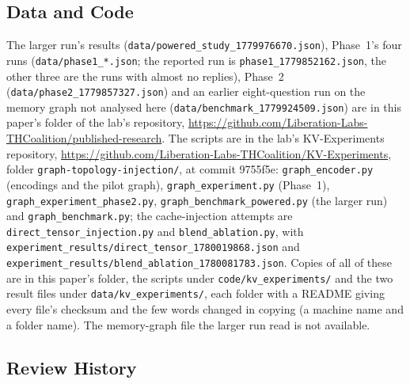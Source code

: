 \documentclass[11pt,a4paper]{article}
\begin{document}
\subsection*{Data and Code}

The larger run's results (\nolinkurl{data/powered_study_1779976670.json}), Phase~1's four runs (\nolinkurl{data/phase1_*.json}; the reported run is \nolinkurl{phase1_1779852162.json}, the other three are the runs with almost no replies), Phase~2 (\nolinkurl{data/phase2_1779857327.json}) and an earlier eight-question run on the memory graph not analysed here (\nolinkurl{data/benchmark_1779924509.json}) are in this paper's folder of the lab's repository, \url{https://github.com/Liberation-Labs-THCoalition/published-research}. The scripts are in the lab's KV-Experiments repository, \url{https://github.com/Liberation-Labs-THCoalition/KV-Experiments}, folder \nolinkurl{graph-topology-injection/}, at commit 9755f5e: \nolinkurl{graph_encoder.py} (encodings and the pilot graph), \nolinkurl{graph_experiment.py} (Phase~1), \nolinkurl{graph_experiment_phase2.py}, \nolinkurl{graph_benchmark_powered.py} (the larger run) and \nolinkurl{graph_benchmark.py}; the cache-injection attempts are \nolinkurl{direct_tensor_injection.py} and \nolinkurl{blend_ablation.py}, with \nolinkurl{experiment_results/direct_tensor_1780019868.json} and \nolinkurl{experiment_results/blend_ablation_1780081783.json}. Copies of all of these are in this paper's folder, the scripts under \nolinkurl{code/kv_experiments/} and the two result files under \nolinkurl{data/kv_experiments/}, each folder with a README giving every file's checksum and the few words changed in copying (a machine name and a folder name). The memory-graph file the larger run read is not available.

\subsection*{Review History}
\end{document}
